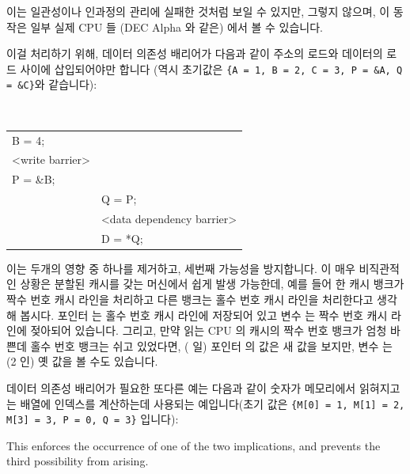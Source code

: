 \begin{enumerate}
이는 일관성이나 인과정의 관리에 실패한 것처럼 보일 수 있지만, 그렇지 않으며, 이
동작은 일부 실제 CPU 들 (DEC Alpha 와 같은) 에서 볼 수 있습니다.

이걸 처리하기 위해, 데이터 의존성 배리어가 다음과 같이 주소의 로드와 데이터의
로드 사이에 삽입되어야만 합니다 (역시 초기값은
{\tt \{A = 1, B = 2, C = 3, P = \&A, Q = \&C\}}와 같습니다):

\vspace{5pt}
\begin{minipage}[t]{\columnwidth}
\tt
\scriptsize
\begin{tabular}{l|p{1.5in}}
	\nf{CPU 1} &	\nf{CPU 2} \\
	\hline
	B = 4; & \\
	<write barrier> & \\
	P = \&B; &	\\
		&	Q = P; \\
		&	<data dependency barrier> \\
		&	D = *Q; \\
\end{tabular}
\end{minipage}
\vspace{5pt}

이는 두개의 영향 중 하나를 제거하고, 세번째 가능성을 방지합니다.
이 매우 비직관적인 상황은 분할된 캐시를 갖는 머신에서 쉽게 발생 가능한데, 예를
들어 한 캐시 뱅크가 짝수 번호 캐시 라인을 처리하고 다른 뱅크는 홀수 번호 캐시
라인을 처리한다고 생각해 봅시다.
포인터  는 홀수 번호 캐시 라인에 저장되어 있고 변수  는 짝수 번호
캐시 라인에 젖아되어 있습니다.
그리고, 만약 읽는 CPU 의 캐시의 짝수 번호 뱅크가 엄청 바쁜데 홀수 번호 뱅크는
쉬고 있었다면, ( 일) 포인터  의 값은 새 값을 보지만, 변수 
는 (2 인) 옛 값을 볼 수도 있습니다.

데이터 의존성 배리어가 필요한 또다른 예는 다음과 같이 숫자가 메모리에서
읽혀지고는 배열에 인덱스를 계산하는데 사용되는 예입니다(초기 값은 {\tt \{M[0] =
1, M[1] = 2, M[3] = 3, P = 0, Q = 3\}} 입니다):
\iffalse

This enforces the occurrence of one of the two implications, and prevents the
third possibility from arising.


\end{enumerate}
